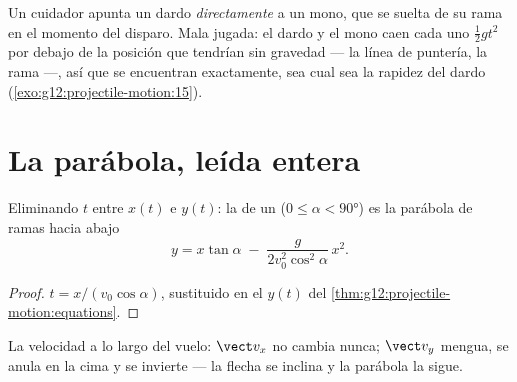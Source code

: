 \begin{remark}\label{rem:g12:projectile-motion:monkey}
Un cuidador apunta un dardo \emph{directamente} a un mono, que se suelta de su rama en
el momento del disparo. Mala jugada: el dardo y el mono caen cada uno $\tfrac12 gt^2$
por debajo de la posición que tendrían sin gravedad --- la línea de puntería, la rama
---, así que se encuentran exactamente, sea cual sea la rapidez del dardo
(\cref{exo:g12:projectile-motion:15}).
\end{remark}

\section{La parábola, leída entera}

\begin{theorem}[Trayectoria]\label{thm:g12:projectile-motion:trajectory}
Eliminando $t$ entre $x(t)$ e $y(t)$: la  de un 
($0 \leq \alpha < \ang{90}$) es la parábola de ramas hacia abajo
\[
y = x\tan\alpha \;-\; \frac{g}{2 v_0^2 \cos^2\alpha}\, x^2 .
\]
\end{theorem}

\begin{proof}
$t = x/(v_0\cos\alpha)$, sustituido en el $y(t)$ del
\cref{thm:g12:projectile-motion:equations}.
\end{proof}

\begin{omfigure}

{\small La velocidad a lo largo del vuelo: $\vect v_x$ no cambia nunca; $\vect v_y$
mengua, se anula en la cima y se invierte --- la flecha se inclina y la parábola la
sigue.}
\end{omfigure}

